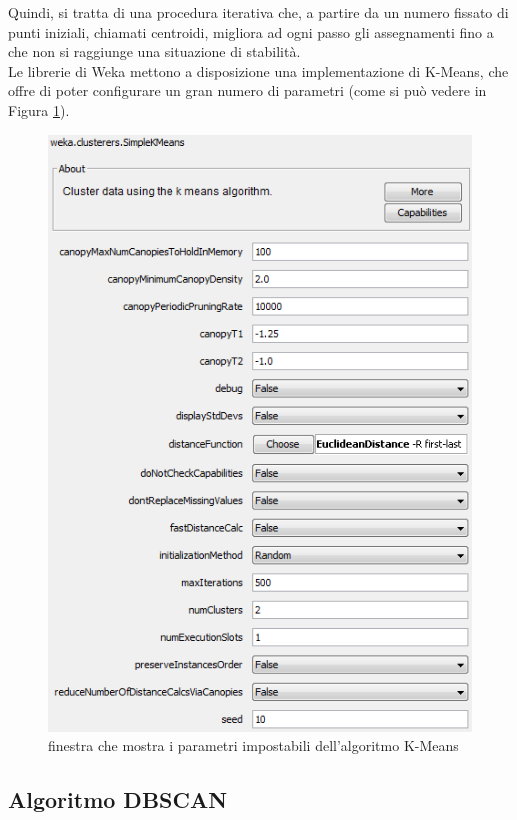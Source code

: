        Quindi, si tratta di una procedura iterativa che, a partire da un numero fissato di punti iniziali, chiamati centroidi, migliora ad ogni passo gli assegnamenti fino a che non si raggiunge una situazione di stabilità. \\

        Le librerie di Weka mettono a disposizione una implementazione di K-Means, che offre di poter configurare un gran numero di parametri (come si può vedere in Figura \ref{kmeans_weka}).

        \begin{figure}
            \centering
            \caption{finestra che mostra i parametri impostabili dell'algoritmo K-Means}
            \label{kmeans_weka}
            \includegraphics[scale=0.90]{img/cluster_k_means.png}
        \end{figure}

    \subsection{Algoritmo DBSCAN}

